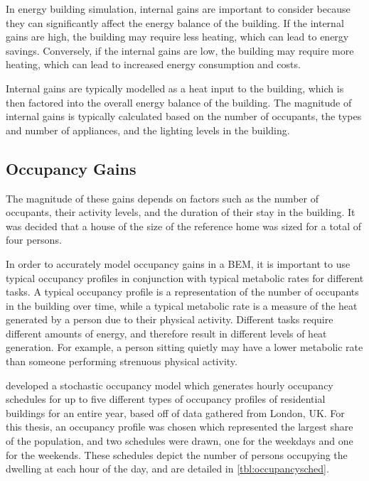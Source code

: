 In energy building simulation, internal gains are important to consider because they can significantly affect the energy balance of the building. If the internal gains are high, the building may require less heating, which can lead to energy savings. Conversely, if the internal gains are low, the building may require more heating, which can lead to increased energy consumption and costs. \cite{buttitta_high-temporal_2020}

Internal gains are typically modelled as a heat input to the building, which is then factored into the overall energy balance of the building. The magnitude of internal gains is typically calculated based on the number of occupants, the types and number of appliances, and the lighting levels in the building.

\subsection{Occupancy Gains}
The magnitude of these gains depends on factors such as the number of occupants, their activity levels, and the duration of their stay in the building. It was decided that a house of the size of the reference home was sized for a total of four persons. 

In order to accurately model occupancy gains in a \ac{BEM}, it is important to use typical occupancy profiles in conjunction with typical metabolic rates for different tasks. A typical occupancy profile is a representation of the number of occupants in the building over time, while a typical metabolic rate is a measure of the heat generated by a person due to their physical activity. Different tasks require different amounts of energy, and therefore result in different levels of heat generation. For example, a person sitting quietly may have a lower metabolic rate than someone performing strenuous physical activity.

\citeauthor{buttitta_high-temporal_2020} \cite{buttitta_high-temporal_2020} developed a stochastic occupancy model which generates hourly occupancy schedules for up to five different types of occupancy profiles of residential buildings for an entire year, based off of data gathered from London, UK. For this thesis, an occupancy profile was chosen which represented the largest share of the population, and two schedules were drawn, one for the weekdays and one for the weekends. These schedules depict the number of persons occupying the dwelling at each hour of the day, and are detailed in \cref{tbl:occupancysched}.

